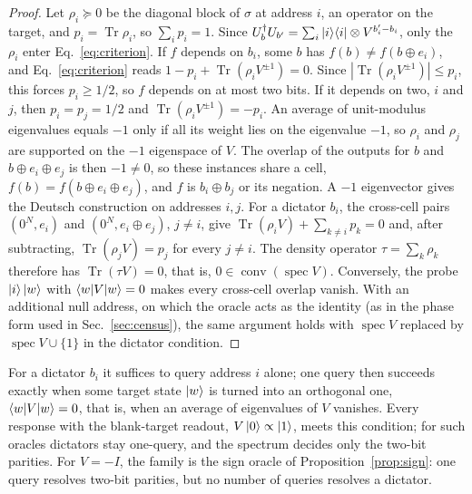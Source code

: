 \documentclass[
  aps,
  pra,
  reprint,
  nofootinbib
]{revtex4-2}
\begin{document}
\begin{proof}
Let \(\rho_i\succeq0\) be the diagonal block of \(\sigma\) at address \(i\), an
operator on the target, and \(p_i=\operatorname{Tr}\rho_i\), so
\(\sum_ip_i=1\). Since
\(U_b^\dagger U_{b'}=\sum_i\ket i\!\bra i\otimes V^{b'_i-b_i}\), only the
\(\rho_i\) enter Eq.~\eqref{eq:criterion}. If \(f\) depends on \(b_i\), some
\(b\) has \(f(b)\neq f(b\oplus e_i)\), and Eq.~\eqref{eq:criterion} reads
\(1-p_i+\operatorname{Tr}(\rho_iV^{\pm1})=0\). Since
\(|\operatorname{Tr}(\rho_iV^{\pm1})|\le p_i\), this forces \(p_i\ge1/2\), so
\(f\) depends on at most two bits. If it depends on two, \(i\) and \(j\), then
\(p_i=p_j=1/2\) and \(\operatorname{Tr}(\rho_iV^{\pm1})=-p_i\). An average of
unit-modulus eigenvalues equals \(-1\) only if all its weight lies on the
eigenvalue \(-1\), so \(\rho_i\) and \(\rho_j\) are supported on the \(-1\)
eigenspace of \(V\). The overlap of the
outputs for \(b\) and \(b\oplus e_i\oplus e_j\) is then \(-1\neq0\), so these
instances share a cell, \(f(b)=f(b\oplus e_i\oplus e_j)\), and \(f\) is
\(b_i\oplus b_j\) or its negation. A \(-1\) eigenvector gives the Deutsch
construction on addresses \(i,j\). For a dictator \(b_i\), the cross-cell
pairs \((0^N,e_i)\) and \((0^N,e_i\oplus e_j)\), \(j\neq i\), give
\(\operatorname{Tr}(\rho_iV)+\sum_{k\neq i}p_k=0\) and, after subtracting,
\(\operatorname{Tr}(\rho_jV)=p_j\) for every \(j\neq i\). The density operator
\(\tau=\sum_k\rho_k\) therefore has \(\operatorname{Tr}(\tau V)=0\), that is,
\(0\in\operatorname{conv}(\operatorname{spec}V)\). Conversely, the probe
\(\ket i\ket w\) with \(\braket{w|V|w}=0\) makes every cross-cell overlap
vanish. With an additional null address, on which the oracle acts as the
identity (as in the phase form used in Sec.~\ref{sec:census}), the same
argument holds with \(\operatorname{spec}V\) replaced by
\(\operatorname{spec}V\cup\{1\}\) in the dictator condition.
\end{proof}

For a dictator \(b_i\) it suffices to query address \(i\) alone; one query
then succeeds exactly when some target state \(\ket w\) is turned into an
orthogonal one, \(\braket{w|V|w}=0\), that is, when an average of eigenvalues
of \(V\) vanishes. Every response with the blank-target readout,
\(V\ket0\propto\ket1\), meets this condition; for such oracles dictators stay
one-query, and the spectrum decides only the two-bit parities. For \(V=-I\),
the family is the sign oracle of
Proposition~\ref{prop:sign}:
one query resolves two-bit parities, but no number of queries resolves a
dictator.
\end{document}

